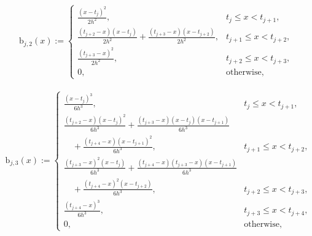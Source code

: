 \documentclass{iitthesis}
\theoremstyle{definition}
\theoremstyle{remark}
\begin{document}
\begin{align*}
  \text{b}_{j,2}(x):= \begin{cases} \displaystyle \frac{(x-t_{j})^2}{2h^2}, & t_{j} \le x < t_{j+1},\\[1ex]
\displaystyle \frac{(t_{j+2}-x)(x-t_{j})}{2h^2}+\frac{(t_{j+3}-x)(x-t_{j+2})}{2h^2}, & t_{j+1} \le x < t_{j+2},\\[1ex]
\displaystyle \frac{(t_{j+3}-x)^2}{2h^2}, & t_{j+2} \le x < t_{j+3},\\[1ex]
\displaystyle  0, & \text{otherwise},
\end{cases}
\end{align*}

\begin{align*}
  \text{b}_{j,3}(x):= \begin{cases} \displaystyle \frac{(x-t_{j})^3}{6h^3}, & t_{j} \le x < t_{j+1},\\[1ex]
\displaystyle \frac{(t_{j+2}-x)(x-t_{j})^2}{6h^3}+\frac{(t_{j+3}-x)(x-t_{j})(x-t_{j+1})}{6h^3}\\[1ex]\displaystyle\quad+\frac{(t_{j+4}-x)(x-t_{j+1})^2}{6h^3},& t_{j+1} \le x < t_{j+2},\\[1ex]
\displaystyle \frac{(t_{j+3}-x)^2(x-t_{j})}{6h^3}+\frac{(t_{j+4}-x)(t_{j+3}-x)(x-t_{j+1})}{6h^3}\\[1ex]\displaystyle\quad+\frac{(t_{j+4}-x)^2(x-t_{j+2})}{6h^3},& t_{j+2} \le x < t_{j+3},\\[1ex]
\displaystyle \frac{(t_{j+4}-x)^3}{6h^3}, & t_{j+3} \le x < t_{j+4},\\[1ex]
\displaystyle  0, & \text{otherwise},
\end{cases}
\end{align*}

\end{document}
